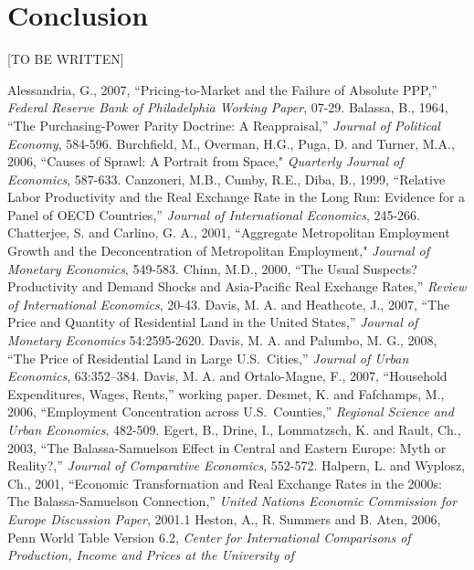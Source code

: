 \documentclass[12pt]{article}
\begin{document}
\section{Conclusion}
[TO BE WRITTEN]

\begin{thebibliography}{99}
 Alessandria, G., 2007, ``Pricing-to-Market and the Failure of Absolute PPP,'' \emph{Federal Reserve Bank of Philadelphia Working Paper}, 07-29.
 Balassa, B., 1964, ``The Purchasing-Power Parity Doctrine: A Reappraisal,'' \emph{Journal of Political Economy}, 584-596.
 Burchfield, M., Overman, H.G., Puga, D. and Turner, M.A., 2006, ``Causes of Sprawl: A Portrait from Space," \emph{Quarterly Journal of Economics}, 587-633.
 Canzoneri, M.B., Cumby, R.E., Diba, B., 1999, ``Relative Labor Productivity and the Real Exchange Rate in the Long Run: Evidence for a Panel of OECD Countries,'' \emph{Journal of International Economics}, 245-266.
 Chatterjee, S. and Carlino, G. A., 2001, ``Aggregate Metropolitan Employment Growth and the Deconcentration of Metropolitan Employment," \emph{Journal of Monetary Economics}, 549-583.
 Chinn, M.D., 2000, ``The Usual Suspects? Productivity and Demand Shocks and Asia-Pacific Real Exchange Rates,'' \emph{Review of International Economics}, 20-43.
 Davis, M. A. and Heathcote, J., 2007, ``The Price and Quantity of Residential Land in the United States,'' \emph{Journal of Monetary Economics} 54:2595-2620.
 Davis, M. A. and Palumbo, M. G., 2008, ``The Price
of Residential Land in Large U.S.~Cities,'' \emph{Journal of Urban Economics}, 63:352--384.
\bibitem{} Davis, M. A. and Ortalo-Magne, F., 2007, ``Household Expenditures, Wages, Rents,'' working paper.
 Desmet, K. and Fafchamps, M., 2006, ``Employment Concentration across U.S.~Counties,'' \emph{Regional Science and Urban Economics}, 482-509.
 Egert, B., Drine, I., Lommatzsch, K. and Rault, Ch., 2003, ``The Balassa-Samuelson Effect in Central and Eastern Europe: Myth or Reality?,'' \emph{Journal of Comparative Economics}, 552-572.
\bibitem{} Halpern, L. and Wyplosz, Ch., 2001, ``Economic Transformation and Real Exchange Rates in the 2000s: The Balassa-Samuelson Connection,'' \emph{United Nations Economic Commission for Europe Discussion Paper}, 2001.1
 Heston, A., R. Summers and B. Aten, 2006, Penn World Table Version 6.2, \emph{Center for International Comparisons of Production, Income and Prices at the University of
}
\end{thebibliography}
\end{document}
